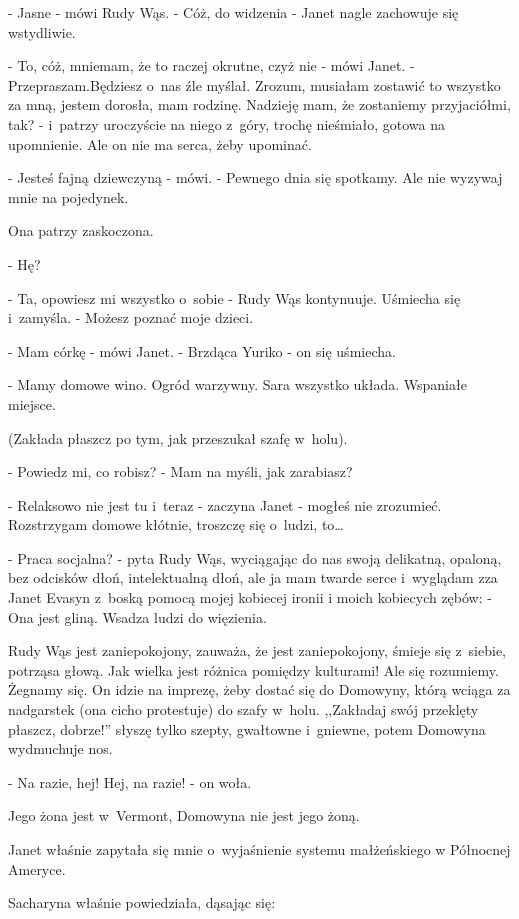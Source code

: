 \documentclass[oneside,polish,12pt,sfheadings]{mwbk}
\begin{document}
- Jasne - mówi Rudy Wąs. - Cóż, do widzenia - Janet nagle zachowuje
się wstydliwie.

- To, cóż, mniemam, że to raczej okrutne, czyż nie - mówi Janet. -
Przepraszam.Będziesz o~nas źle myślał. Zrozum, musiałam zostawić to wszystko za
mną, jestem dorosła, mam rodzinę. Nadzieję mam, że zostaniemy przyjaciółmi,
tak? - i~patrzy uroczyście na niego z~góry, trochę nieśmiało, gotowa
na upomnienie. Ale on nie ma serca, żeby upominać.

- Jesteś fajną dziewczyną - mówi. - Pewnego dnia się spotkamy. Ale
nie wyzywaj mnie na pojedynek.

Ona patrzy zaskoczona. 

- Hę?

- Ta, opowiesz mi wszystko o~sobie - Rudy Wąs kontynuuje. Uśmiecha
się i~zamyśla. - Możesz poznać moje dzieci.

- Mam córkę - mówi Janet. - Brzdąca Yuriko - on się uśmiecha.

- Mamy domowe wino. Ogród warzywny. Sara wszystko układa. Wspaniałe
miejsce.

(Zakłada płaszcz po tym, jak przeszukał szafę w~holu). 

- Powiedz mi,
co robisz? - Mam na myśli, jak zarabiasz?

- Relaksowo nie jest tu i~teraz - zaczyna Janet - mogłeś nie zrozumieć.
Rozstrzygam domowe kłótnie, troszczę się o~ludzi, to\ldots

- Praca socjalna? - pyta Rudy Wąs, wyciągając do nas swoją delikatną,
opaloną, bez odcisków dłoń, intelektualną dłoń, ale ja mam twarde
serce i~wyglądam zza Janet Evasyn z~boską pomocą mojej kobiecej ironii
i moich kobiecych zębów: - Ona jest gliną. Wsadza ludzi do więzienia.

Rudy Wąs jest zaniepokojony, zauważa, że jest zaniepokojony, śmieje
się z~siebie, potrząsa głową. Jak wielka jest różnica pomiędzy kulturami!
Ale się rozumiemy. Żegnamy się. On idzie na imprezę, żeby dostać się
do Domowyny, którą wciąga za nadgarstek (ona cicho protestuje) do
szafy w~holu. ,,Zakładaj swój przeklęty płaszcz, dobrze!'' słyszę
tylko szepty, gwałtowne i~gniewne, potem Domowyna wydmuchuje nos.

- Na razie, hej! Hej, na razie! - on woła.

Jego żona jest w~Vermont, Domowyna nie jest jego żoną.

Janet właśnie zapytała się mnie o~wyjaśnienie systemu małżeńskiego
w Północnej Ameryce.

Sacharyna właśnie powiedziała, dąsając się: 
\end{document}
